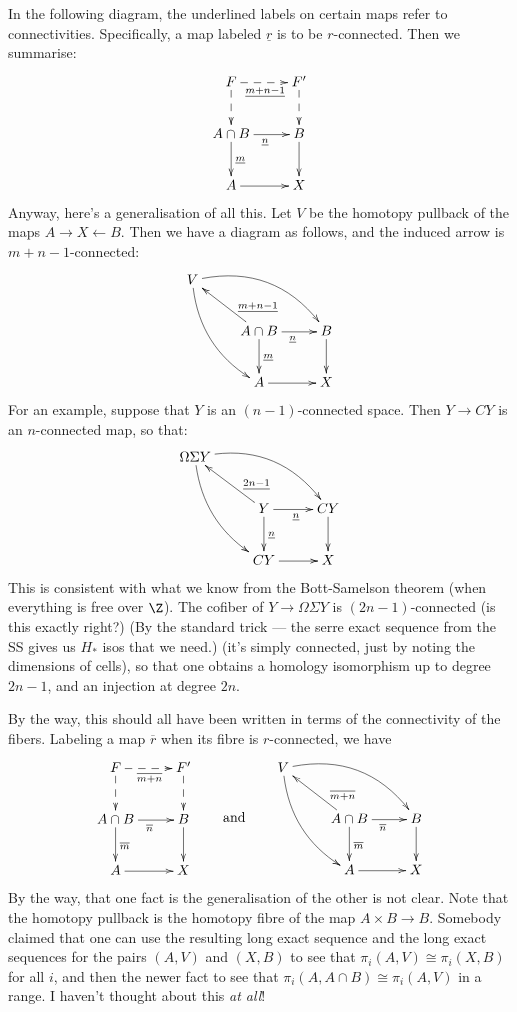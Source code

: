 \documentclass[11pt]{article}
\begin{document}
In the following diagram, the underlined labels on certain maps refer to
connectivities. Specifically, a map labeled $\underline r$ is to be
$r$-connected. Then we summarise:
\[\xymatrix{
F\ar@{-->}[r]_{\underline{m+n-1}}\ar@{-->}[d]&F'\ar@{-->}[d]\\
A\cap B\ar[d]^{\underline{m}}\ar[r]_{\underline{{n}}}&B\ar[d]\\
A\ar[r]&X
}\]
Anyway, here's a generalisation of all this. Let $V$ be the homotopy pullback of
the maps $A\rightarrow X\leftarrow B$. Then we have a diagram as follows, and
the induced arrow is $m+n-1$-connected:
\[\xymatrix{
V\ar@/_1pc/[ddr]\ar@/^1.5pc/[rrd]\\
&A\cap B\ar[ul]_(.3){\underline{m+n-1}}\ar[d]^{\underline{m}}
\ar[r]_{\underline{{n}}}&B\ar[d]\\
&A\ar[r]&X
}\]
For an example, suppose that $Y$ is an $(n-1)$-connected space. Then $Y\to CY$
is an $n$-connected map, so that:
\[\xymatrix{
\Omega\Sigma Y\ar@/_1pc/[ddr]\ar@/^1.5pc/[rrd]\\
&Y\ar[ul]_(.3){\underline{2n-1}}\ar[d]^{\underline{n}}
\ar[r]_{\underline{{n}}}&CY\ar[d]\\
&CY\ar[r]&X
}\]
This is consistent with what we know from the Bott-Samelson theorem (when
everything is free over $\Z$). The cofiber of $Y\to \Omega\Sigma Y$ is
$(2n-1)$-connected (is this exactly right?) (By the standard trick --- the serre
exact sequence from the SS gives us $H_*$ isos that we need.) (it's simply
connected, just by noting the dimensions of cells), so that one obtains a
homology isomorphism up to degree $2n-1$, and an injection at degree $2n$.

By the way, this should all have been written in terms of the connectivity of
the fibers. Labeling a map $\overline r$ when its fibre is $r$-connected, we
have
\[
\xymatrix{
F\ar@{-->}[r]_{\overline{m+n}}\ar@{-->}[d]&F'\ar@{-->}[d]\\
A\cap B\ar[d]^{\overline{m}}\ar[r]_{\overline{{n}}}&B\ar[d]\\
A\ar[r]&X
}\raisebox{-1.26cm}{\qquad and\qquad }\xymatrix{
V\ar@/_1pc/[ddr]\ar@/^1.5pc/[rrd]\\
&A\cap B\ar[ul]_(.3){\overline{m+n}}\ar[d]^{\overline{m}}
\ar[r]_{\overline{{n}}}&B\ar[d]\\
&A\ar[r]&X
}\]
By the way, that one fact is the generalisation of the other is not clear. Note
that the homotopy pullback is the homotopy fibre of the map $A\times B\to B$.
Somebody claimed that one can use the resulting long exact sequence and the long
exact sequences for the pairs $(A,V)$ and $(X,B)$ to see that
$\pi_i(A,V)\cong\pi_i(X,B)$ for all $i$, and then the newer fact to see that
$\pi_i(A,A\cap B)\cong\pi_i(A,V)$ in a range. I haven't thought about this
\emph{at all}!
\end{document}
